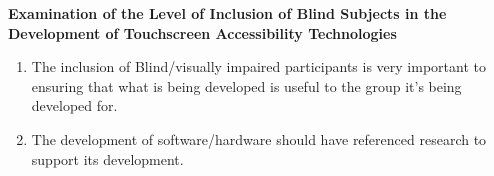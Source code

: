 \documentclass{article}
\begin{document}
\cite{thompson2018examination}\textbf{Examination of the Level of Inclusion of Blind Subjects in the Development of Touchscreen Accessibility Technologies }

\begin{enumerate}
    \item The inclusion of Blind/visually impaired participants is very important to ensuring that what is being developed is useful to the group it's being developed for. 

    \item The development of software/hardware should have referenced research to support its development. 

\end{enumerate}



\newpage


\end{document}
